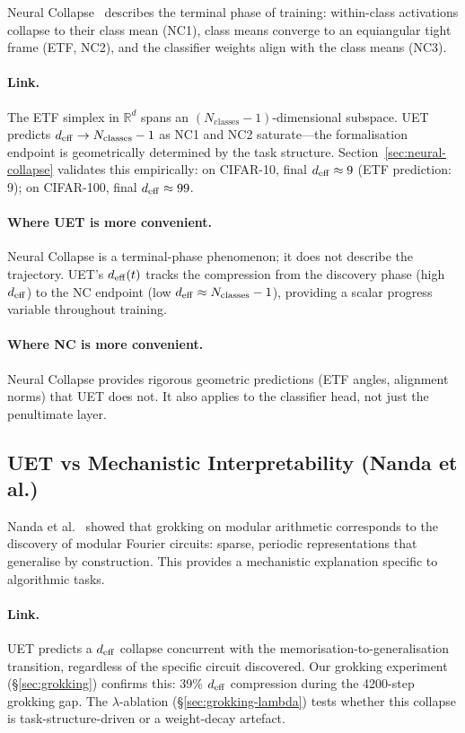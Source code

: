 Neural Collapse~\citep{papyan2020nc} describes the terminal phase of training:
within-class activations collapse to their class mean (NC1), class means
converge to an equiangular tight frame (ETF, NC2), and the classifier weights
align with the class means (NC3).

\paragraph{Link.}
The ETF simplex in $\mathbb{R}^d$ spans an $(N_\mathrm{classes} - 1)$-dimensional
subspace.
UET predicts $d_{\mathrm{eff}} \to N_\mathrm{classes} - 1$ as NC1 and NC2 saturate---the
formalisation endpoint is geometrically determined by the task structure.
Section~\ref{sec:neural-collapse} validates this empirically: on CIFAR-10,
final $d_{\mathrm{eff}} \approx 9$ (ETF prediction: 9); on CIFAR-100, final $d_{\mathrm{eff}} \approx 99$.

\paragraph{Where UET is more convenient.}
Neural Collapse is a terminal-phase phenomenon; it does not describe the
trajectory.
UET's $d_{\mathrm{eff}}(t)$ tracks the compression from the discovery phase (high $d_{\mathrm{eff}}$)
to the NC endpoint (low $d_{\mathrm{eff}} \approx N_\mathrm{classes} - 1$), providing a
scalar progress variable throughout training.

\paragraph{Where NC is more convenient.}
Neural Collapse provides rigorous geometric predictions (ETF angles, alignment
norms) that UET does not.
It also applies to the classifier head, not just the penultimate layer.

\subsection{UET vs Mechanistic Interpretability (Nanda et al.)}
\label{sec:vs-mech}

Nanda et al.~\citep{grokking_lit} showed that grokking on modular arithmetic
corresponds to the discovery of modular Fourier circuits: sparse, periodic
representations that generalise by construction.
This provides a mechanistic explanation specific to algorithmic tasks.

\paragraph{Link.}
UET predicts a $d_{\mathrm{eff}}$ collapse concurrent with the memorisation-to-generalisation
transition, regardless of the specific circuit discovered.
Our grokking experiment (§\ref{sec:grokking}) confirms this: 39\% $d_{\mathrm{eff}}$
compression during the 4200-step grokking gap.
The $\lambda$-ablation (§\ref{sec:grokking-lambda}) tests whether this collapse is
task-structure-driven or a weight-decay artefact.

